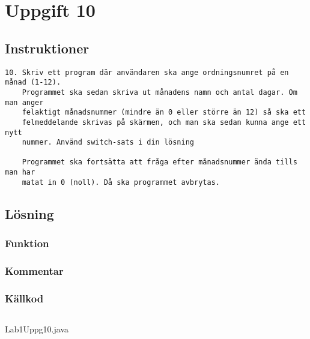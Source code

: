 \section{Uppgift 10}\label{uppgift-10}

\subsection{Instruktioner}
\begin{verbatim}
10. Skriv ett program där användaren ska ange ordningsnumret på en månad (1-12).
    Programmet ska sedan skriva ut månadens namn och antal dagar. Om man anger
    felaktigt månadsnummer (mindre än 0 eller större än 12) så ska ett
    felmeddelande skrivas på skärmen, och man ska sedan kunna ange ett nytt
    nummer. Använd switch-sats i din lösning

    Programmet ska fortsätta att fråga efter månadsnummer ända tills man har
    matat in 0 (noll). Då ska programmet avbrytas.
\end{verbatim}


\subsection{Lösning}
\subsubsection{Funktion}
\subsubsection{Kommentar}

\subsubsection{Källkod}\label{uppgift-10_src}
    \inputminted[linenos]{java}{src/Lab1Uppg10.java}
    \caption{Lab1Uppg10.java}
    \label{Uppg10src}
